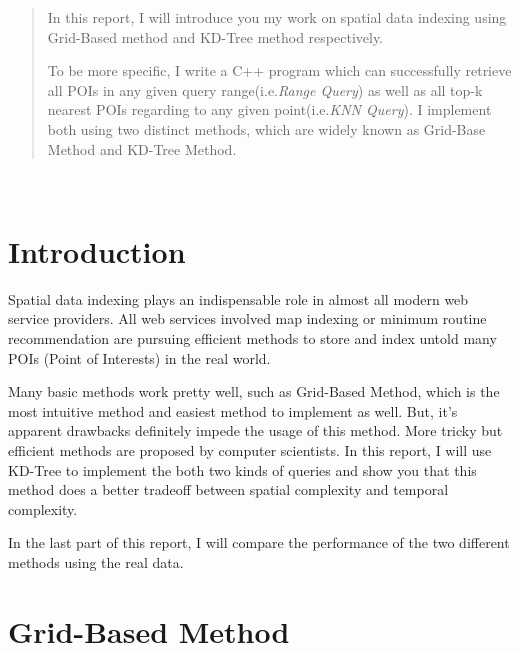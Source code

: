 \documentclass{acm_proc_article-sp}
\begin{document}
\maketitle
\begin{abstract}

In this report, I will introduce you my work on spatial data indexing using Grid-Based method and KD-Tree method respectively. 

To be more specific, I write a C++ program which can successfully retrieve all POIs in any given query range(i.e.\textit{Range Query}) as well as all top-k nearest POIs regarding to any given point(i.e.\textit{KNN Query}). I implement both using two distinct methods, which are widely known as Grid-Base Method and KD-Tree Method.
\end{abstract}


\\

\section{Introduction}

Spatial data indexing plays an indispensable role in almost all modern web service providers. All web services involved map indexing or minimum routine recommendation are pursuing efficient methods to store and index untold many POIs (Point of Interests) in the real world.

Many basic methods work pretty well, such as Grid-Based Method, which is the most intuitive method and easiest method to implement as well. But, it's apparent drawbacks definitely impede the usage of this method. More tricky but efficient methods are proposed by computer scientists. In this report, I will use KD-Tree to implement the both two kinds of queries and show you that this method does a better tradeoff between spatial complexity and temporal complexity.

In the last part of this report, I will compare the performance of the two different methods using the real data.
\\

\section{Grid-Based Method}
\end{document}
